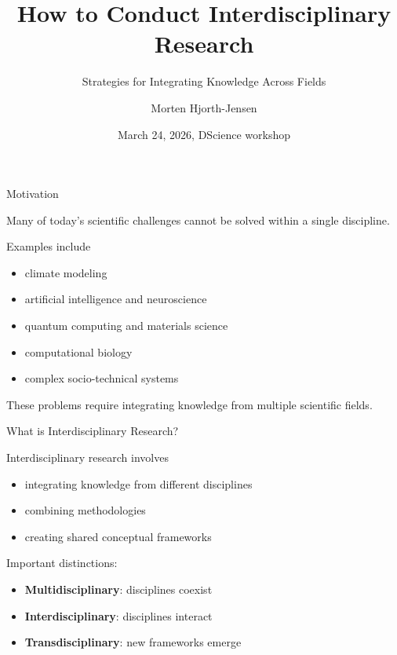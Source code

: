 \documentclass{beamer}
\title{How to Conduct Interdisciplinary Research}
\subtitle{Strategies for Integrating Knowledge Across Fields}
\author{Morten Hjorth-Jensen}
\date{March 24, 2026, DScience workshop}
\begin{document}
\frame{\titlepage}


\begin{frame}{Motivation}

Many of today's scientific challenges cannot be solved
within a single discipline.

Examples include

\begin{itemize}
\item climate modeling
\item artificial intelligence and neuroscience
\item quantum computing and materials science
\item computational biology
\item complex socio-technical systems
\end{itemize}

These problems require integrating knowledge
from multiple scientific fields.

\end{frame}


\begin{frame}{What is Interdisciplinary Research?}

Interdisciplinary research involves

\begin{itemize}
\item integrating knowledge from different disciplines
\item combining methodologies
\item creating shared conceptual frameworks
\end{itemize}

Important distinctions:

\begin{itemize}
\item \textbf{Multidisciplinary}: disciplines coexist
\item \textbf{Interdisciplinary}: disciplines interact
\item \textbf{Transdisciplinary}: new frameworks emerge
\end{itemize}

\end{frame}

\end{document}

